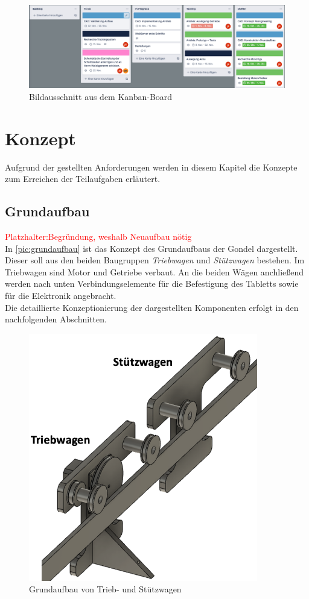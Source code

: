 \begin{figure}[h] %
	\includegraphics[width=17cm]{kanban.png}
	\caption{Bildausschnitt aus dem Kanban-Board}
	\label{pic:kanban}
\end{figure}


\chapter{Konzept}
Aufgrund der gestellten Anforderungen werden in diesem Kapitel die Konzepte zum Erreichen der Teilaufgaben erläutert. \newpage

\section{Grundaufbau}
\textcolor{red}{Platzhalter:Begründung, weshalb Neuaufbau nötig}\\
In  \autoref{pic:grundaufbau} ist das Konzept des Grundaufbaus der Gondel dargestellt. Dieser soll aus den beiden Baugruppen \textit{Triebwagen} und \textit{Stützwagen} bestehen. Im Triebwagen sind Motor und Getriebe verbaut. An die beiden Wägen anchließend werden nach unten Verbindungselemente für die Befestigung des Tabletts sowie für die Elektronik angebracht. \\
Die detaillierte Konzeptionierung der dargestellten Komponenten erfolgt in den nachfolgenden Abschnitten. 

\begin{figure}[h]
	\centering
	\includegraphics[width=10cm]{grundaufbau.png} 
	\caption{Grundaufbau von Trieb- und Stützwagen}
	\label{pic:grundaufbau}
\end{figure}


